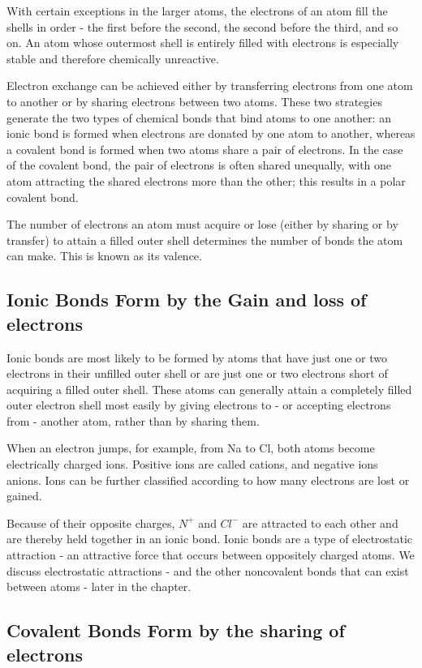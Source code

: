 With certain exceptions in the larger atoms, the electrons of an atom fill 
the shells in order - the first before the second, the second before the third, 
and so on. An atom whose outermost shell is entirely filled with electrons 
is especially stable and therefore chemically unreactive.

Electron exchange can be achieved either by transferring electrons from one 
atom to another or by sharing electrons between two atoms. These two strategies generate the two
types of chemical bonds that bind atoms to one another: an ionic bond
is formed when electrons are donated by one atom to another, whereas a
covalent bond is formed when two atoms share a pair of electrons.
In the case of the covalent bond, the pair of electrons is often shared
unequally, with one atom attracting the shared electrons more than the
other; this results in a polar covalent bond.

The number of electrons an atom must acquire or lose (either by sharing or 
by transfer) to attain a filled outer shell determines the number of bonds 
the atom can make. This is known as its valence.

\subsection{Ionic Bonds Form by the Gain and loss of electrons}

Ionic bonds are most likely to be formed by atoms that have just one or
two electrons in their unfilled outer shell or are just one or two electrons
short of acquiring a filled outer shell. These atoms can generally attain
a completely filled outer electron shell most easily by giving electrons
to - or accepting electrons from - another atom, rather than by sharing
them.

When an electron jumps, for example, from Na to Cl, both atoms become 
electrically charged ions.
Positive ions are called cations, and negative ions anions. Ions can be
further classified according to how many electrons are lost or gained.

Because of their opposite charges, $N^{+}$ and $Cl^{-}$ are attracted to each other
and are thereby held together in an ionic bond.
Ionic bonds are a type of electrostatic attraction - an attractive force
that occurs between oppositely charged atoms.
We discuss electrostatic attractions - and the other noncovalent bonds that 
can exist between atoms - later in the chapter.

\subsection{Covalent Bonds Form by the sharing of electrons}

